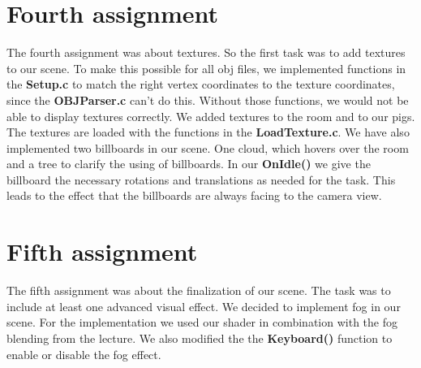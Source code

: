 \documentclass[a4paper, 12pt]{article}
\begin{document}
\section{Fourth assignment}
The fourth assignment was about textures. So the first task was to add textures to our scene. To make this possible for all obj files, we implemented functions in the \textbf{Setup.c} to match the right vertex coordinates to the texture coordinates, since the \textbf{OBJParser.c} can't do this. Without those functions, we would not be able to display textures correctly. We added textures to the room and to our pigs. The textures are loaded with the functions in the \textbf{LoadTexture.c}. We have also implemented two billboards in our scene. One cloud, which hovers over the room and a tree to clarify the using of billboards. In our \textbf{OnIdle()} we give the billboard the necessary rotations and translations as needed for the task. This leads to the effect that the billboards are always facing to the camera view.
\section{Fifth assignment}
The fifth assignment was about the finalization of our scene. The task was to include at least one advanced visual effect. We decided to implement fog in our scene. For the implementation we used our shader in combination with the fog blending from the lecture. We also modified the the \textbf{Keyboard()} function to enable or disable the fog effect.
\end{document}
